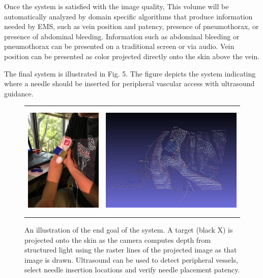 \documentclass{llncs}
\begin{document}
Once the system is satisfied with the image quality, This volume will be automatically analyzed by domain specific algorithms that produce information needed by EMS, such as vein position and patency, presence of pneumothorax, or presence of abdominal bleeding. Information such as abdominal bleeding or pneumothorax can be presented on a traditional screen or via audio. Vein position can be presented as color projected directly onto the skin above the vein.

The final system is illustrated in Fig. 5.  The figure depicts the system indicating where a needle should be inserted for peripheral vascular access with ultrasound guidance.

\begin{figure}
\centering
\begin{tabular}{cc}
\centering
\includegraphics[height=5.5cm,keepaspectratio]{Hastings_arm} &
\includegraphics[height=5.5cm,keepaspectratio]{Hastings_arm_pointcloud}\\
\end{tabular}

\caption{An illustration of the end goal of the system. A target (black X) is projected onto the skin as the camera computes depth from structured light using the raster lines of the projected image as that image is drawn. Ultrasound can be used to detect peripheral vessels, select needle insertion locations and verify needle placement patency.
}

\end{figure}
\end{document}
